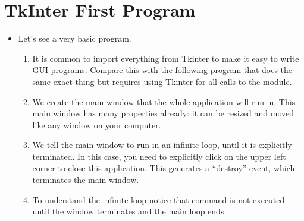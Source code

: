 \documentclass[letterpaper,10pt,english]{sphinxmanual}
\begin{document}
\section{TkInter First Program}
\label{\detokenize{lecture_notes/lec22_tkinter:tkinter-first-program}}\begin{itemize}
\item {} 
Let’s see a very basic program.

%
\begin{sphinxVerbatim}[commandchars=\\\{\}]
    

             
       
        
\end{sphinxVerbatim}
\begin{enumerate}
\item {} 
It is common to import everything from Tkinter to make it
easy to write GUI programs. Compare this with the following
program that does the same exact thing but requires using
Tkinter for all calls to the module.

%
\begin{sphinxVerbatim}[commandchars=\\\{\}]
 
  
\end{sphinxVerbatim}

\item {} 
We create the main window that the whole application will
run in. This main window has many properties already: it can be
resized and moved like any window on your computer.

\item {} 
We tell the main window to run in an infinite loop, until it is
explicitly terminated. In this case, you need to explicitly
click on the upper left corner to close this application. This
generates a “destroy” event, which terminates the main window.

\item {} 
To understand the infinite loop notice that 
command is not executed until the window terminates and the
main loop ends.

\end{enumerate}

\end{itemize}
\end{document}
